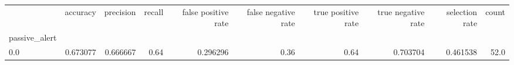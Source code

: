 \begin{tabular}{lrrrrrrrrr}
\toprule
{} &  accuracy &  precision &  recall &  false positive rate &  false negative rate &  true positive rate &  true negative rate &  selection rate &  count \\
passive\_alert &           &            &         &                      &                      &                     &                     &                 &        \\
\midrule
0.0           &  0.673077 &   0.666667 &    0.64 &             0.296296 &                 0.36 &                0.64 &            0.703704 &        0.461538 &   52.0 \\
\bottomrule
\end{tabular}
